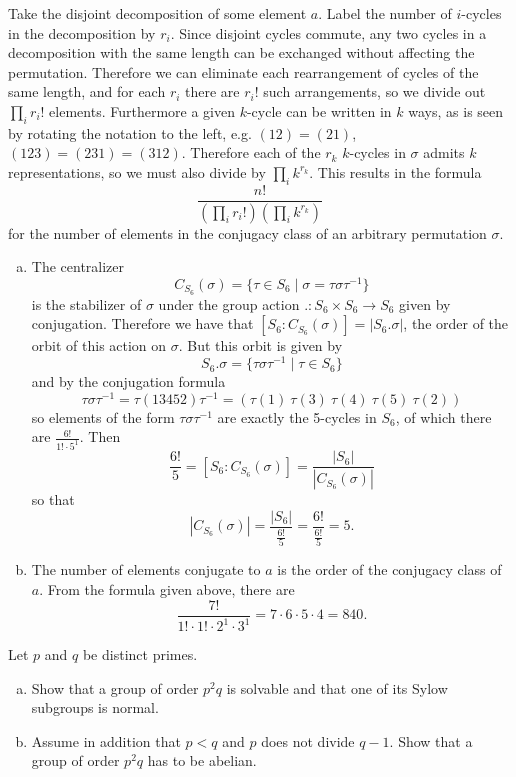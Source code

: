 \documentclass{article}
\newcounter{Problem}
\newenvironment{Problem}{\begin{Exercise}[name={Problem},
                                          counter={Problem}]}
                        {\end{Exercise}}
\begin{document}
\begin{Answer}
Take the disjoint decomposition of some element $a$.
Label the number of $i$-cycles in the decomposition by $r_i$.
 Since disjoint cycles commute, any two cycles in a decomposition
with the same length can be exchanged without affecting the
permutation. Therefore we can eliminate each rearrangement of
cycles of the same length, and for each $r_i$ there are $r_i!$ such
arrangements, so we divide out $\prod_{i} r_i!$ elements.
Furthermore a given $k$-cycle can be written in $k$ ways, as is seen
by rotating the notation to the left, e.g.
$(12) = (21)$, $(123) = (231) = (312)$. Therefore each of the
$r_k$ $k$-cycles in $\sigma$ admits $k$ representations, so we must
also divide by $\prod_i k^{r_k}$. This results in the formula
$$
\frac{n!}{\left(\prod_{i} r_i!\right) \left(\prod_i k^{r_k}\right)}
$$
for the number of elements in the conjugacy class of an arbitrary
permutation $\sigma$.

\begin{enumerate}[(a)]
  \item{
    The centralizer
    $$
    C_{S_6}(\sigma) =
    \{ \tau \in S_6
       \mid \sigma = \tau \sigma \tau^{-1}
    \}
    $$
    is the stabilizer of $\sigma$ under the group action
    $. : S_6 \times S_6 \to S_6$ given by conjugation. Therefore we have
    that $[S_6 : C_{S_6}(\sigma)] = |S_6 . \sigma|$, the order of the orbit of this
    action on $\sigma$. But this orbit is given by
    $$
    S_6 . \sigma =
    \{ \tau \sigma \tau^{-1} \mid \tau \in S_6 \}
    $$
    and by the conjugation formula
    $$
    \tau \sigma \tau^{-1}
    = \tau (13452) \tau^{-1}
    = (\tau(1) ~ \tau(3) ~ \tau(4) ~ \tau(5) ~ \tau(2))
    $$
    so elements of the form $\tau \sigma \tau^{-1}$ are exactly the
    5-cycles in $S_6$, of which there are $\frac{6!}{1! \cdot 5^1}$. Then
    $$
    \frac{6!}{5} = [S_6 : C_{S_6}(\sigma)] = \frac{|S_6|}{|C_{S_6}(\sigma)|}
    $$
    so that
    $$
    |C_{S_6}(\sigma)| = \frac{|S_6|}{\frac{6!}{5}}
                     = \frac{6!}{\frac{6!}{5}}
                     = 5.
    $$
  }
  \item{
    The number of elements conjugate to $a$ is the order of the
    conjugacy class of $a$. From the formula given above,
    there are
    $$
    \frac{7!}{1! \cdot 1! \cdot 2^1 \cdot 3^1} =
    7 \cdot 6 \cdot 5 \cdot 4 = 840.
    $$
  }
\end{enumerate}
\end{Answer}

\pagebreak

\begin{Problem}
Let $p$ and $q$ be distinct primes.
\begin{enumerate}[(a)]
  \item{
    Show that a group of order $p^2 q$ is solvable and that one of its
    Sylow subgroups is normal.
  }
  \item{
    Assume in addition that $p < q$ and $p$ does not divide $q -
    1$. Show that a group of order $p^2 q$ has to be abelian.
  }
\end{enumerate}
\end{Problem}
\end{document}
